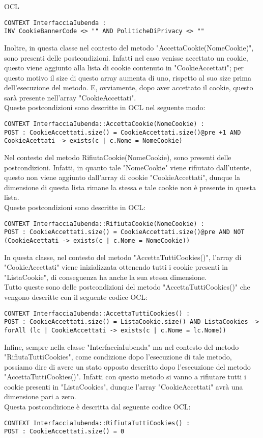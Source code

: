 \begin{listaPersonale}{OCL}
        \begin{lstlisting}
CONTEXT InterfacciaIubenda :
INV CookieBannerCode <> "" AND PoliticheDiPrivacy <> ""
    \end{lstlisting}
        Inoltre, in questa classe nel contesto del metodo "AccettaCookie(NomeCookie)", sono presenti delle postcondizioni. Infatti nel caso venisse accettato un cookie, questo viene aggiunto alla lista di cookie contenuto in "CookieAccettati"; per questo motivo il size di questo array aumenta di uno, rispetto al suo size prima dell'esecuzione del metodo. E, ovviamente, dopo aver accettato il cookie, questo sarà presente nell'array "CookieAccettati". \\
        Queste postcondizioni sono descritte in OCL nel seguente modo:
        \begin{lstlisting}
CONTEXT InterfacciaIubenda::AccettaCookie(NomeCookie) :
POST : CookieAccettati.size() = CookieAccettati.size()@pre +1 AND CookieAcettati -> exists(c | c.Nome = NomeCookie)
    \end{lstlisting}
        Nel contesto del metodo RifiutaCookie(NomeCookie), sono presenti delle postcondizioni. Infatti, in quanto tale "NomeCookie" viene rifiutato dall'utente, questo non viene aggiunto dall'array di cookie "CookieAccettati", dunque la dimensione di questa lista rimane la stessa e tale cookie non è presente in questa lista.\\
        Queste postcondizioni sono descritte in OCL:
        \begin{lstlisting}
CONTEXT InterfacciaIubenda::RifiutaCookie(NomeCookie) :
POST : CookieAccettati.size() = CookieAccettati.size()@pre AND NOT (CookieAcettati -> exists(c | c.Nome = NomeCookie))
    \end{lstlisting}
        In questa classe, nel contesto del metodo "AccettaTuttiCookies()", l'array di "CookieAccettati" viene inizializzata ottenendo tutti i cookie presenti in "ListaCookie", di conseguenza ha anche la sua stessa dimensione. \\
        Tutto queste sono delle postcondizioni del metodo "AccettaTuttiCookies()" che vengono descritte con il seguente codice OCL:
        \begin{lstlisting}
CONTEXT InterfacciaIubenda::AccettaTuttiCookies() :
POST : CookieAccettati.size() = ListaCookie.size() AND ListaCookies -> forAll (lc | CookieAccettati -> exists(c | c.Nome = lc.Nome))
    \end{lstlisting}
        Infine, sempre nella classe "InterfacciaIubenda" ma nel contesto del metodo "RifiutaTuttiCookies", come condizione dopo l'esecuzione di tale metodo, possiamo dire di avere un stato opposto descritto dopo l'esecuzione del metodo "AccettaTuttiCookies()". Infatti con questo metodo si vanno a rifiutare tutti i cookie presenti in "ListaCookies", dunque l'array "CookieAccettati" avrà una dimensione pari a zero.\\
        Questa postcondizione è descritta dal seguente codice OCL:
        \begin{lstlisting}
CONTEXT InterfacciaIubenda::RifiutaTuttiCookies() :
POST : CookieAccettati.size() = 0
    \end{lstlisting}





\end{listaPersonale}
